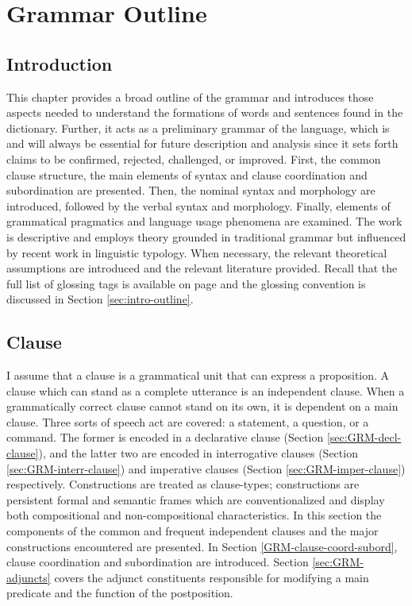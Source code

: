 \chapter{Grammar Outline}
\label{sec:gramsketch}


\section{Introduction}
\label{sec:Introduction}

This chapter  provides a broad outline of the grammar and introduces those 
aspects needed to understand the formations of words and sentences found in the 
dictionary. Further, it acts as a preliminary grammar of the language, which is 
and will always be essential for future description and analysis since it sets 
forth claims to be confirmed, rejected, challenged,  or improved.   First, the 
common clause structure, the main elements of syntax and clause coordination and 
subordination are presented. Then, the nominal syntax and morphology are 
introduced,  followed by the verbal syntax and morphology. Finally, elements of 
grammatical pragmatics and language usage phenomena are examined.  The work is 
descriptive and employs theory grounded in traditional grammar but  influenced 
by  recent work in linguistic typology. When necessary, the relevant theoretical 
assumptions are introduced and the relevant literature provided. Recall that the 
full list of glossing tags is available on page \pageref{sec-ABB} and the 
glossing convention is discussed in Section \ref{sec:intro-outline}.

\section{Clause}
\label{sec:GRM-nom}
I assume that a clause is a  grammatical unit that can express a proposition. A  clause which 
can stand as a complete utterance is an independent clause. When 
a grammatically correct clause cannot stand on its own, it is dependent on  a 
main clause.  Three sorts of speech act are covered: a statement, a question, or 
a command. The former is encoded in a declarative clause (Section 
\ref{sec:GRM-decl-clause}), and the latter two are encoded in interrogative 
clauses (Section \ref{sec:GRM-interr-clause}) and imperative clauses  (Section 
\ref{sec:GRM-imper-clause}) respectively.  Constructions are treated as 
clause-types; constructions are persistent formal and semantic frames which are 
conventionalized and display both compositional and non-compositional 
characteristics. In this section  the components of the common and frequent 
independent  clauses and the major constructions encountered are presented.  In 
Section \ref{GRM-clause-coord-subord},  clause coordination and subordination 
are introduced. Section \ref{sec:GRM-adjuncts} covers the adjunct constituents
responsible for modifying a main predicate and the function of the postposition.



